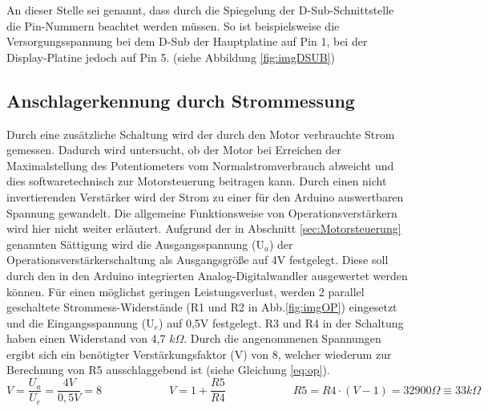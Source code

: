 \documentclass[11pt, titlepage]{report}
\begin{document}
				An dieser Stelle sei genannt, dass durch die Spiegelung der D-Sub-Schnittstelle die Pin-Nummern beachtet werden müssen. So ist beispielsweise die Versorgungsspannung bei dem D-Sub der Hauptplatine auf Pin 1, bei der Display-Platine jedoch auf Pin 5. (siehe Abbildung \ref{fig:imgDSUB})
			\newpage
			\subsection{Anschlagerkennung durch Strommessung}
			\label{sec:op}
				 Durch eine zusätzliche Schaltung wird der durch den Motor verbrauchte Strom gemessen. Dadurch wird untersucht, ob der Motor bei Erreichen der Maximalstellung des Potentiometers vom Normalstromverbrauch abweicht und dies softwaretechnisch zur Motorsteuerung beitragen kann. Durch einen nicht invertierenden Verstärker wird der Strom zu einer für den Arduino auswertbaren Spannung gewandelt. Die allgemeine Funktionsweise von Operationsverstärkern wird hier nicht weiter erläutert. 
				 \newline Aufgrund der in Abschnitt \ref{sec:Motorsteuerung} genannten Sättigung wird die Ausgangsspannung (U$_{a}$) der Operationsverstärkerschaltung als Ausgangsgröße auf 4V festgelegt. Diese soll durch den in den Arduino integrierten Analog-Digitalwandler ausgewertet werden können. Für einen möglichst geringen Leistungsverlust, werden 2 parallel geschaltete Strommess-Widerstände (R1 und R2 in Abb.\ref{fig:imgOP}) eingesetzt und die Eingangsspannung (U$_{e}$) auf 0,5V festgelegt. R3 und R4 in der Schaltung haben einen Widerstand von 4,7 $k\Omega$. Durch die angenommenen Spannungen ergibt sich ein benötigter Verstärkungsfaktor (V) von 8, welcher wiederum zur Berechnung von R5 ausschlaggebend ist (siehe Gleichung \ref{eq:op}).
				\begin{equation}
					\label{eq:op}
					V = \frac{U_a}{U_e} =\frac{4V}{0,5V}= 8 \hspace{6em} V = 1+\frac{R5}{R4} \hspace{6em} R5 = R4\cdot(V-1) = 32900\Omega \equiv 33k\Omega
				\end{equation}
\end{document}
